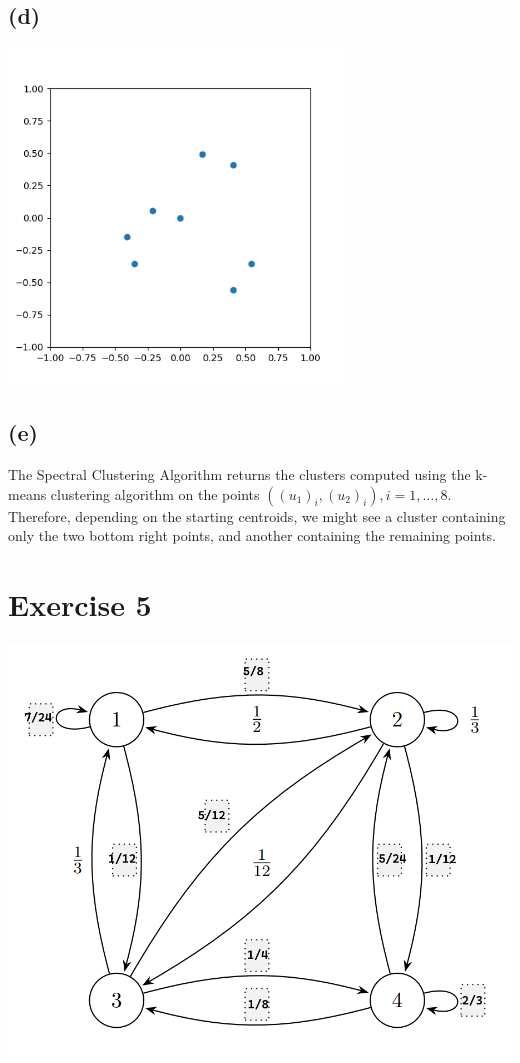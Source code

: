 \documentclass[12pt]{article}
\begin{document}
\subsection*{(d)}
\begin{center}
	\includegraphics[width=3.5in]{code/exercise_04_d.png}
\end{center}

\subsection*{(e)}
The Spectral Clustering Algorithm returns the clusters computed using the k-means clustering algorithm on the points $\left( (u_1)_i, (u_2)_i \right), i = 1, \dots, 8$. Therefore, depending on the starting centroids, we might see a cluster containing only the two bottom right points, and another containing the remaining points.

\section*{Exercise 5}
\begin{center}
	\includegraphics[width=\textwidth]{code/exercise_05.png}
\end{center}
\end{document}
